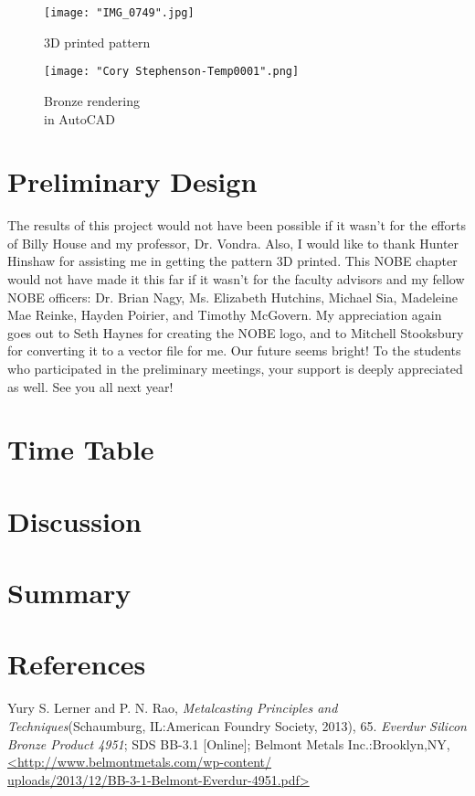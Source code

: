 \documentclass{article}
\begin{document}
\begin{figure}[H]
\captionsetup{format =hang}
  \begin{minipage}[b]{0.4\textwidth}
    \texttt{[image: "IMG\_0749".jpg]}
    \caption{3D printed pattern}
    \label{fig:1}
  \end{minipage}
  \hfill
  \begin{minipage}[b]{0.4\textwidth}
    \texttt{[image: "Cory Stephenson-Temp0001".png]}
    \caption{Bronze rendering\\ in AutoCAD}
    \label{fig:2}
  \end{minipage}
\end{figure}



\section{Preliminary Design}


The results of this project would not have been possible if it wasn't for the efforts of Billy House and my professor, Dr. Vondra. Also, I would like to thank Hunter Hinshaw for assisting me in getting the pattern 3D printed. This NOBE chapter would not have made it this far if it wasn't for the faculty advisors and my fellow NOBE officers: Dr. Brian Nagy, Ms. Elizabeth Hutchins, Michael Sia, Madeleine Mae Reinke, Hayden Poirier, and Timothy McGovern. My appreciation again goes out to Seth Haynes for creating the NOBE logo, and to Mitchell Stooksbury for converting it to a vector file for me. Our future seems bright! To the students who participated in the preliminary meetings, your support is deeply appreciated as well. See you all next year!



\section{Time Table}

\section{Discussion}

\section{Summary}

\section{References}


   
\cleardoublepage
\begin{thebibliography}{9}
 Yury S. Lerner and P. N. Rao, \textit{Metalcasting Principles and Techniques}(Schaumburg, IL:American Foundry Society, 2013), 65.
 \textit{Everdur Silicon Bronze Product 4951}; SDS BB-3.1 [Online]; Belmont Metals Inc.:Brooklyn,NY,\url{<http://www.belmontmetals.com/wp-content/} \\
\url{uploads/2013/12/BB-3-1-Belmont-Everdur-4951.pdf>}

\end{thebibliography} 
\end{document}

